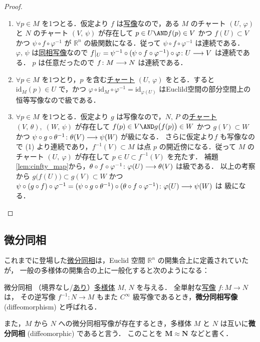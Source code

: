 \documentclass[geometry_main]{subfiles}
\begin{document}
\begin{proof}
	\begin{enumerate}
		\item $\forall p \in M$ を1つとる．仮定より $f$ は\hyperref[def.cinfty_mapping]{\cinfty 写像}なので，ある $M$ のチャート $(U,\, \varphi)$ と $N$ のチャート $(V,\, \psi)$ が存在して $p \in U \AND f(p) \in V$ かつ $f(U) \subset V$ かつ $\psi \circ f  \circ \varphi^{-1}$ が $\mathbb{R}^n$ の\cinfty 級関数になる．従って $\psi \circ f \circ \varphi^{-1}$ は連続である．
		$\varphi,\, \psi$ は\hyperref[def.homeo]{同相写像}なので $f|_U = \psi^{-1} \circ (\psi \circ f \circ \varphi^{-1}) \circ \varphi \colon U \longrightarrow V$ は連続である．
		$p$ は任意だったので $f \colon M \longrightarrow N$ は連続である．
		\item $\forall p \in M$ を1つとり，$p$ を含む\hyperref[diffmani]{\cinfty チャート} $(U,\, \varphi)$ をとる．すると $\mathrm{id}_M (p) \in U$ で，かつ $\varphi \circ \mathrm{id}_{M} \circ \varphi^{-1} = \mathrm{id}_{\varphi(U)}$ はEuclild空間の部分空間上の恒等写像なので\cinfty 級である．
		\item $\forall p \in M$ を1つとる．仮定より $g$ は\cinfty 写像なので，$N,\, P$ の\hyperref[diffmani]{\cinfty チャート} $(V,\, \theta),\; (W,\, \psi)$ が存在して $f(p) \in V \AND g \bigl( f(p) \bigr) \in W$ かつ $g(V) \subset W$ かつ $\psi \circ g \circ \theta^{-1} \colon \theta(V) \longrightarrow \psi(W)$ が\cinfty 級になる．
		さらに仮定より$f$ も\cinfty 写像なので (1) より連続であり，$f^{-1}(V) \subset M$ は点 $p$ の開近傍になる．従って $M$ のチャート $(U,\ \varphi)$ が存在して $p \in U \subset f^{-1}(V)$ を充たす．
		補題\ref{lem:cinfty_map}から，$\theta \circ f \circ \varphi^{-1} \colon \varphi(U) \longrightarrow \theta(V)$ は\cinfty 級である．
		以上の考察から $g \bigl( f(U) \bigr) \subset g(V) \subset W$ かつ $\psi \circ (g \circ f) \circ \varphi^{-1} = (\psi \circ g  \circ \theta^{-1}) \circ (\theta \circ f \circ \varphi^{-1}) \colon \varphi (U) \longrightarrow \psi(W)$	は \cinfty 級になる．
	\end{enumerate}
\end{proof}


\subsection{微分同相}

これまでに登場した\hyperref[def.diffeomo]{微分同相}は，Euclid 空間 $\mathbb{R}^n$ の開集合上に定義されていたが，
一般の\cinfty 多様体の開集合の上に一般化すると次のようになる：
\begin{mydef}[label=def.diff]{微分同相}
	（境界なし/\hyperref[def:mani-with-boundary]{あり}）\hyperref[diffmani]{\cinfty 多様体} $M,\, N$ を与える．
	全単射な\hyperref[def.cinfty_mapping]{\cinfty 写像} $f \colon M \to N$ は，
	その逆写像 $f^{-1} \colon N \to M$ もまた $C^\infty$ 級写像であるとき，\textbf{微分同相写像} (diffeomorphism) と呼ばれる．

	また，$M$ から $N$ への微分同相写像が存在するとき，多様体 $M$ と $N$ は互いに\textbf{微分同相} (diffeomorphic) であると言う． このことを $\bm{M \approx N}$ などと書く．
\end{mydef}
\end{document}
